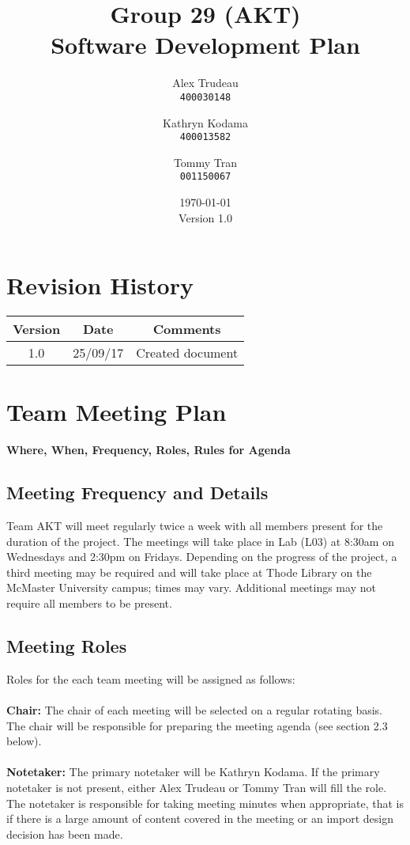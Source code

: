 \documentclass[12pt,fleqn]{article}
\title{Group 29 (AKT)\\ Software Development Plan}
\author{
Alex Trudeau\\
	\texttt{400030148}
\and
Kathryn Kodama\\
  	\texttt{400013582}
\and
Tommy Tran\\
	\texttt{001150067}
}
\date{\today\\Version 1.0}
\begin{document}
\maketitle



\pagebreak
\tableofcontents

\section {Revision History}
\begin{tabular}{ |c| c| c| }
\hline
Version & Date & Comments \\
\hline
1.0 & 25/09/17 & Created document \\
\hline

\end{tabular}


\pagebreak

\section{Team Meeting Plan}
\textbf{Where, When, Frequency, Roles, Rules for Agenda}

\subsection{Meeting Frequency and Details}

Team AKT will meet regularly twice a week with all members present for the duration of the project.  The meetings will take place in Lab (L03) at 8:30am on Wednesdays and 2:30pm on Fridays.  Depending on the progress of the project, a third meeting may be required and will take place at Thode Library on the McMaster University campus; times may vary.  Additional meetings may not require all members to be present.

\subsection{Meeting Roles}
Roles for the each team meeting will be assigned as follows:\\ \\
\textbf{Chair:} The chair of each meeting will be selected on a regular rotating basis.  The chair will be responsible for preparing the meeting agenda (see section 2.3 below).\\ \\
\textbf{Notetaker:} The primary notetaker will be Kathryn Kodama.  If the primary notetaker is not present, either Alex Trudeau or Tommy Tran will fill the role.  The notetaker is responsible for taking meeting minutes when appropriate, that is if there is a large amount of content covered in the meeting or an import design decision has been made.  
\end{document}
